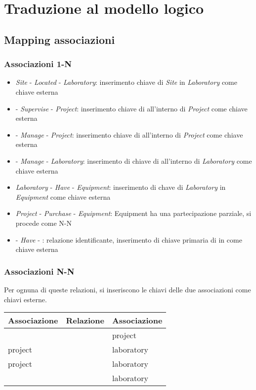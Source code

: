 \section{Traduzione al modello logico}
\subsection{Mapping associazioni}
\subsubsection{Associazioni 1-N}
\begin{itemize}
	\item \textit{Site} - \textit{Located} - \textit{Laboratory}:  inserimento chiave di \textit{Site} in \textit{Laboratory} come chiave esterna
	\item \textit{\baseemp} - \textit{Supervise} - \textit{Project}: inserimento chiave di \textit{\baseemp} all'interno di \textit{Project} come chiave esterna
	\item \textit{\baseemp} - \textit{Manage} - \textit{Project}: inserimento chiave di \textit{\baseemp} all'interno di \textit{Project} come chiave esterna
	\item \textit{\baseemp} - \textit{Manage} - \textit{Laboratory}: inserimento di chiave di \textit{\baseemp} all'interno di \textit{Laboratory} come chiave esterna
	\item \textit{Laboratory} - \textit{Have} - \textit{Equipment}: inserimento di chave di \textit{Laboratory} in \textit{Equipment} come chiave esterna
	\item \textit{Project} - \textit{Purchase} - \textit{Equipment}: Equipment ha una partecipazione parziale, si procede come N-N
	\item \textit{\baseemp} - \textit{Have} - \textit{\careerlog}: relazione identificante, inserimento di chiave primaria di \textit{\baseemp} in \textit{\careerlog} come chiave esterna
\end{itemize}
\subsubsection{Associazioni N-N}
Per ognuna di queste relazioni, si inseriscono le chiavi delle due associazioni come chiavi esterne.\meskip
\begin{tabular}{@{}| l | l | l |}
	\hline
	\textbf{Associazione} & \textbf{Relazione} & \textbf{Associazione} \\
	\hline
	\projectsalaried      & \workson           & project               \\
	\hline
	project               & \takepart          & laboratory            \\
	\hline
	project               & \equipmentrequest  & laboratory            \\
	\hline
	\baseemp              & \worksat           & laboratory            \\
	\hline
\end{tabular}

